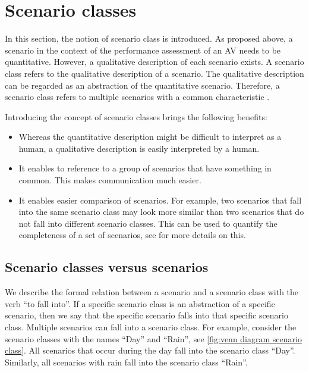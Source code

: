 \section{Scenario classes}
\label{sec:scenario classes}

In this section, the notion of scenario class is introduced. As proposed above, a scenario in the context of the performance assessment of an AV needs to be quantitative. However, a qualitative description of each scenario exists. 
A scenario class refers to the qualitative description of a scenario.
The qualitative description can be regarded as an abstraction of the quantitative scenario. Therefore, a scenario class refers to multiple scenarios with a common characteristic \cite{elrofai2018scenario}.

\cbstart
Introducing the concept of scenario classes brings the following benefits:
\begin{itemize}
	\item Whereas the quantitative description might be difficult to interpret as a human, a qualitative description is easily interpreted by a human.
	\item It enables to reference to a group of scenarios that have something in common. This makes communication much easier.
	\item It enables easier comparison of scenarios. For example, two scenarios that fall into the same scenario class may look more similar than two scenarios that do not fall into different scenario classes. This can be used to quantify the completeness of a set of scenarios, see \cite{degelder2019completeness} for more details on this.
\end{itemize}

\subsection{Scenario classes versus scenarios}
\label{sec:fall into method}

We describe the formal relation between a scenario and a scenario class with the verb ``to fall into''. If a specific scenario class is an abstraction of a specific scenario, then we say that the specific scenario falls into that specific scenario class. Multiple scenarios can fall into a scenario class. For example, consider the scenario classes with the names ``Day'' and ``Rain'', see \cref{fig:venn diagram scenario class}. All scenarios that occur during the day fall into the scenario class ``Day''. Similarly, all scenarios with rain fall into the scenario class ``Rain''.

